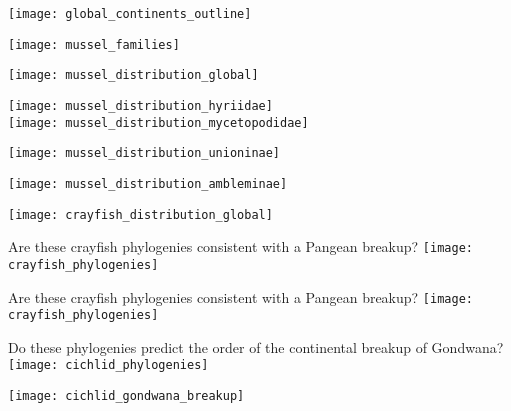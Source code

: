 \documentclass[t]{beamer}
\begin{document}

\begin{frame}[t]
	\texttt{[image: global\_continents\_outline]}
\end{frame}
%
\begin{frame}[t]
	\texttt{[image: mussel\_families]}
\end{frame}
%
\begin{frame}[t]
	\texttt{[image: mussel\_distribution\_global]}
\end{frame}
%
\begin{frame}[t]
	\centering
	\texttt{[image: mussel\_distribution\_hyriidae]}\\
	\texttt{[image: mussel\_distribution\_mycetopodidae]}
\end{frame}
%
\begin{frame}[t]
	\texttt{[image: mussel\_distribution\_unioninae]}
\end{frame}
%
\begin{frame}[t]
	\texttt{[image: mussel\_distribution\_ambleminae]}
\end{frame}
%
\begin{frame}[t]
	\texttt{[image: crayfish\_distribution\_global]}
\end{frame}
%
\begin{frame}[t]{Are these crayfish phylogenies consistent with a Pangean breakup?}
	\texttt{[image: crayfish\_phylogenies]}
\end{frame}
%
\begin{frame}[t]{Are these crayfish phylogenies consistent with a Pangean breakup?}
	\texttt{[image: crayfish\_phylogenies]}
\end{frame}
%
{
\begin{frame}[t]
\end{frame}
}
%
\begin{frame}[t]{Do these phylogenies predict the order of the continental breakup of Gondwana?}
	\centering
	\vspace{-0.5\baselineskip}
	\texttt{[image: cichlid\_phylogenies]}
\end{frame}
%
\begin{frame}[t]
	\texttt{[image: cichlid\_gondwana\_breakup]}
\end{frame}
%

%
%
%
%

%
\end{document}
